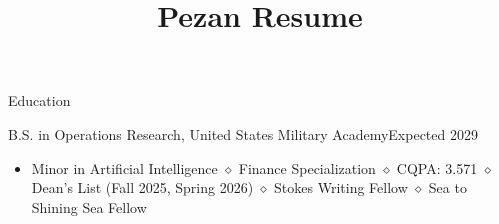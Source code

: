 \documentclass{resume}
\title{Pezan Resume}
\begin{document}
\renewcommand{\labelitemi}{\textendash}

\begin{rSection}{Education}\itemsep -1pt
\begin{rSubsection}{\textnormal{B.S. in Operations Research,} United States Military Academy}{Expected 2029}{}
\vspace{-3pt}
\begin{itemize}
\setlength\itemsep{-1.5ex}
    \item Minor in Artificial Intelligence $\diamond$ Finance Specialization $\diamond$ CQPA: 3.571 $\diamond$ Dean's List (Fall 2025, Spring 2026) $\diamond$ Stokes Writing Fellow $\diamond$ Sea to Shining Sea Fellow
\end{itemize}
\end{rSubsection}
\end{rSection}
\end{document}

